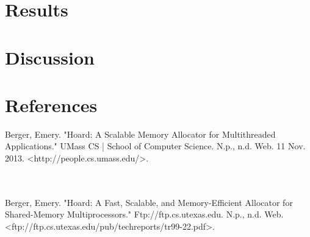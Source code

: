 \documentclass[11pt]{article}
\begin{document}
\section{Results}
\section{Discussion}
 


\section{References}

Berger, Emery. "Hoard: A Scalable Memory Allocator for Multithreaded Applications." UMass CS | School of Computer Science. N.p., n.d. Web. 11 Nov. 2013. <http://people.cs.umass.edu/>.

\\
\\
Berger, Emery. "Hoard: A Fast, Scalable, and Memory-Efficient Allocator for Shared-Memory Multiprocessors." Ftp://ftp.cs.utexas.edu. N.p., n.d. Web. <ftp://ftp.cs.utexas.edu/pub/techreports/tr99-22.pdf>.

\end{document}
